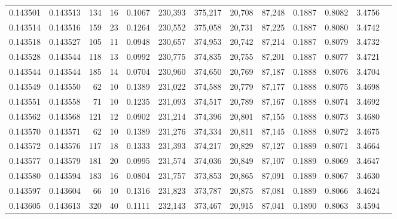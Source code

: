 \begin{tabular}{rrrrrrrrrrrrr}
0.143501 & 0.143513 &   134 &  16 &                                     0.1067 & 230,393 & 375,217 &  20,708 &  87,248 & 0.1887 & 0.8082 & 3.4756 \\
0.143514 & 0.143516 &   159 &  23 &                                     0.1264 & 230,552 & 375,058 &  20,731 &  87,225 & 0.1887 & 0.8080 & 3.4742 \\
0.143518 & 0.143527 &   105 &  11 &                                     0.0948 & 230,657 & 374,953 &  20,742 &  87,214 & 0.1887 & 0.8079 & 3.4732 \\
0.143528 & 0.143544 &   118 &  13 &                                     0.0992 & 230,775 & 374,835 &  20,755 &  87,201 & 0.1887 & 0.8077 & 3.4721 \\
0.143544 & 0.143544 &   185 &  14 &                                     0.0704 & 230,960 & 374,650 &  20,769 &  87,187 & 0.1888 & 0.8076 & 3.4704 \\
0.143549 & 0.143550 &    62 &  10 &                                     0.1389 & 231,022 & 374,588 &  20,779 &  87,177 & 0.1888 & 0.8075 & 3.4698 \\
0.143551 & 0.143558 &    71 &  10 &                                     0.1235 & 231,093 & 374,517 &  20,789 &  87,167 & 0.1888 & 0.8074 & 3.4692 \\
0.143562 & 0.143568 &   121 &  12 &                                     0.0902 & 231,214 & 374,396 &  20,801 &  87,155 & 0.1888 & 0.8073 & 3.4680 \\
0.143570 & 0.143571 &    62 &  10 &                                     0.1389 & 231,276 & 374,334 &  20,811 &  87,145 & 0.1888 & 0.8072 & 3.4675 \\
0.143572 & 0.143576 &   117 &  18 &                                     0.1333 & 231,393 & 374,217 &  20,829 &  87,127 & 0.1889 & 0.8071 & 3.4664 \\
0.143577 & 0.143579 &   181 &  20 &                                     0.0995 & 231,574 & 374,036 &  20,849 &  87,107 & 0.1889 & 0.8069 & 3.4647 \\
0.143580 & 0.143594 &   183 &  16 &                                     0.0804 & 231,757 & 373,853 &  20,865 &  87,091 & 0.1889 & 0.8067 & 3.4630 \\
0.143597 & 0.143604 &    66 &  10 &                                     0.1316 & 231,823 & 373,787 &  20,875 &  87,081 & 0.1889 & 0.8066 & 3.4624 \\
0.143605 & 0.143613 &   320 &  40 &                                     0.1111 & 232,143 & 373,467 &  20,915 &  87,041 & 0.1890 & 0.8063 & 3.4594 \\

\end{tabular}
